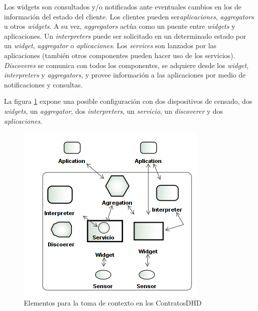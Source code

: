 Los widgets son consultados y/o notificados ante eventuales cambios en los de información del estado del cliente. Los clientes pueden ser\textit{aplicaciones}, \textit{aggregators} u otros \textit{widgets}. A su vez, \textit{aggregators} actúa como un puente entre \textit{widgets} y aplicaciones. Un \textit{interpreters} puede ser solicitado en un determinado estado por un \textit{widget}, \textit{aggregator} o \textit{aplicaciones}. Los \textit{services} son lanzados por las aplicaciones (también otros componentes pueden hacer uso de los servicios). \textit{Discoveres} se comunica con todos los componentes, se adquiere desde los \textit{widget}, \textit{interpreters} y \textit{aggregators}, y provee información a las aplicaciones por medio de notificaciones y consultas.

La figura \ref{fig:toolkit} expone una posible configuración con dos
dispositivos de censado, dos \textit{widgets}, un \textit{aggregator}, dos
\textit{interpreters}, un \textit{servicio}, un \textit{discoverer} y dos
\textit{aplicaciones}.



\begin{figure}
\begin{center}
 \includegraphics [width=5 in,totalheight=2 in]{Ch4/ContextToolsKit.png}
\caption{Elementos para la toma de contexto en los ContratosDHD}
\label{fig:toolkit}
\end{center}
\end{figure}


